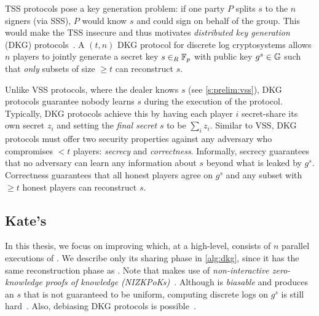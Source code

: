 {\begin{algorithm}[t]
\end{algorithm}
}

TSS protocols pose a key generation problem: if one party $P$ splits $s$ to the $n$ signers (via SSS), $P$ would know $s$ and could sign on behalf of the group.
This would make the TSS insecure and thus motivates \textit{distributed key generation} (DKG) protocols~\cite{GJKR07,Pedersen1991AThreshold}.
A $(t,n)$ DKG protocol for discrete log cryptosystems allows $n$ players to jointly generate a secret key $s\in_R \mathbb{F}_p$ with public key $g^s\in \mathbb{G}$ such that \textit{only} subsets of size $\ge t$ can reconstruct $s$.

Unlike VSS protocols, where the dealer knows $s$ (see \cref{s:prelim:vss}), DKG protocols guarantee nobody learns $s$ during the execution of the protocol.
Typically, DKG protocols achieve this by having each player $i$ secret-share its own secret $z_i$ and setting the \textit{final secret} $s$ to be $\sum_i z_i$.
Similar to VSS, DKG protocols must offer two security properties against any adversary who compromises $<t$ players: \textit{secrecy} and \textit{correctness}.
Informally, secrecy guarantees that no adversary can learn any information about $s$ beyond what is leaked by $g^s$.
Correctness guarantees that all honest players agree on $g^s$ and any subset with $\ge t$ honest players can reconstruct $s$.

\ejfdkgAlgorithm

\subsection{Kate's \ejfdkg}
\label{s:prelim:dkg:ejfdkg}
In this thesis, we focus on improving \ejfdkg which, at a high-level, consists of $n$ parallel executions of \evss.
We describe only its sharing phase in \cref{alg:dkg}, since it has the same reconstruction phase as \evss.
Note that \ejfdkg makes use of \textit{non-interactive zero-knowledge proofs of knowledge (NIZKPoKs)}~\cite{CS97}.
Although \ejfdkg is \textit{biasable} and produces an $s$ that is not guaranteed to be uniform, computing discrete logs on $g^s$ is still hard~\cite{Kate2010,GJKR03}.
Also, debiasing DKG protocols is possible~\cite{GJKR07,NBB16,SJSW19}.